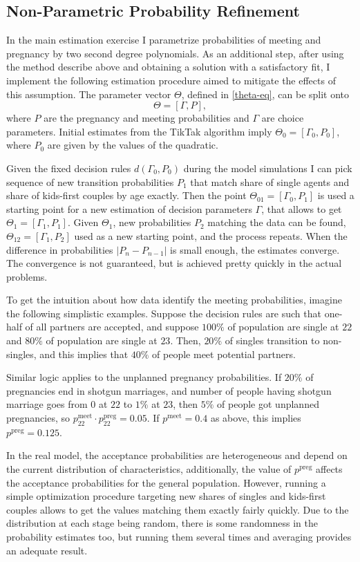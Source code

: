 \documentclass[12pt,letter]{article}
\begin{document}
\iffalse
\subsection{Non-Parametric Probability Refinement}
In the main estimation exercise I parametrize probabilities of meeting and pregnancy by two second degree polynomials. As an additional step, after using the method describe above and obtaining a solution with a satisfactory fit, I implement the following estimation procedure aimed to mitigate the effects of this assumption. The parameter vector $\Theta$, defined in \ref{theta-eq}, can be split onto
\[\Theta = [ \Gamma, P],\]
where $P$ are the pregnancy and meeting probabilities and $\Gamma$ are choice parameters. Initial estimates from the TikTak algorithm imply $\Theta_0 = [\Gamma_0,P_0]$, where $P_0$ are given by the values of the quadratic.

Given the fixed decision rules $d(\Gamma_0,P_0)$ during the model simulations I can pick sequence of new transition probabilities $P_1$ that match share of single agents and share of kids-first couples by age exactly. Then the point $\Theta_{01} = [\Gamma_0,P_1]$ is used a starting point for a new estimation of decision parameters $\Gamma$, that allows to get $\Theta_1 = [\Gamma_1,P_1]$. Given $\Theta_1$, new probabilities $P_2$ matching the data can be found, $\Theta_{12}   = [\Gamma_1,P_2]$ used as a new starting point, and the process repeats. When the difference in probabilities $|P_{n} - P_{n-1}|$ is small enough, the estimates converge. The convergence is not guaranteed, but is achieved pretty quickly in the actual problems. 

To get the intuition about how data identify the meeting probabilities, imagine the following simplistic examples. Suppose the decision rules are such that one-half of all partners are accepted, and suppose $100\%$ of population are single at $22$ and $80\%$ of population are single at $23$. Then, $20\%$ of singles transition to non-singles, and this implies that $40\%$ of people meet potential partners.

Similar logic applies to the unplanned pregnancy probabilities. If $20\%$ of pregnancies end in shotgun marriages, and number of people having shotgun marriage goes from $0$ at $22$ to $1\%$ at $23$, then $5\%$ of people got unplanned pregnancies, so $p^{\text{meet}}_{22}\cdot p^{\text{preg}}_{22} = 0.05$. If $p^{\text{meet}} = 0.4$ as above, this implies $p^{\text{preg}} = 0.125$.

In the real model, the acceptance probabilities are heterogeneous and depend on the current distribution of characteristics, additionally, the value of $p^{\text{preg}}$ affects the acceptance probabilities for the general population. However, running a simple optimization procedure targeting new shares of singles and kids-first couples allows to get the values matching them exactly fairly quickly. Due to the distribution at each stage being random, there is some randomness in the probability estimates too, but running them several times and averaging provides an adequate result.
\end{document}
